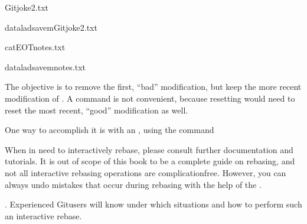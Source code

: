 \begin{sphinxVerbatim}[commandchars=\\\{\}]
\PYGZgt{}\PYGZgt{}Gitjoke2.txt
\end{sphinxVerbatim}

\begin{sphinxVerbatim}[commandchars=\\\{\}]
dataladsave\PYGZhy{}mGitjoke2.txt
\end{sphinxVerbatim}

\begin{sphinxVerbatim}[commandchars=\\\{\}]
cat\PYGZlt{}\PYGZlt{}EOT\PYGZgt{}\PYGZgt{}notes.txt

\end{sphinxVerbatim}

\begin{sphinxVerbatim}[commandchars=\\\{\}]
dataladsave\PYGZhy{}mnotes.txt
\end{sphinxVerbatim}

\sphinxAtStartPar
The objective is to remove the first, “bad” modification, but
keep the more recent modification of . A 
command is not convenient, because resetting would need to reset
the most recent, “good” modification as well.

\sphinxAtStartPar
One way to accomplish it is with an , using the
 command%
\begin{footnote}\sphinxAtStartFootnote
When in need to interactively rebase, please consult further documentation
and tutorials. It is out of scope of this book to be a complete
guide on rebasing, and not all interactive rebasing operations are
complication\sphinxhyphen{}free. However, you can always undo mistakes that occur
during rebasing with the help of the .
%
\end{footnote}. Experienced Git\sphinxhyphen{}users will know
under which situations and how to perform such an interactive rebase.

